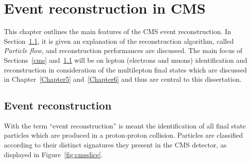 \chapter{Event reconstruction in CMS} \label{Chapter2_5} 



This chapter outlines the main features of the CMS event
reconstruction. In Section~\ref{sec:reconstruction}, it is
given an explanation of the reconstruction algorithm, called
\emph{Particle flow}, and reconstruction performances are
discussed. The main focus of Sections~\ref{cms}
and~\ref{sec:reconstruction} will be on lepton (electrons and muons) identification and
reconstruction in consideration of the multilepton final states which are
discussed in Chapter~\ref{Chapter5} and~\ref{Chapter6} and thus are
central to this dissertation.


\section{Event reconstruction}\label{sec:reconstruction}
With the term ``event reconstruction'' is meant the identification of
all final state particles which are produced in a proton-proton
collision. Particles are classified according to their distinct
signatures they present in 
the CMS detector, as displayed in Figure~\ref{fig:cmsslice}.

